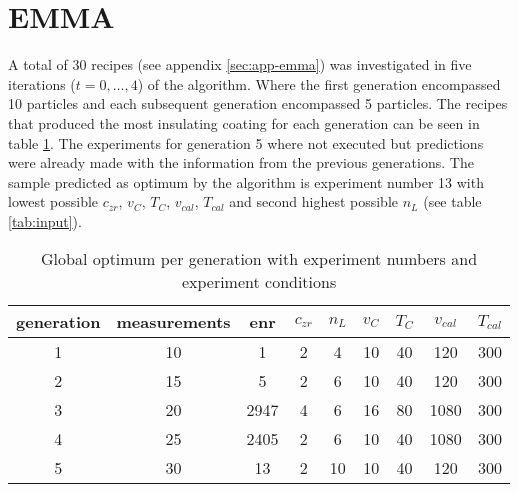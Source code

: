 \section{EMMA}
\label{sec:res-emma}
A total of 30 recipes (see appendix \ref{sec:app-emma}) was investigated in 
five iterations ($t = 0, \dots, 4$) of the algorithm. 
Where the first generation encompassed 10 particles and each subsequent generation encompassed 5 particles. 
The recipes that produced the most insulating coating for each generation can be seen in table \ref{tab:emma-Gb}. 
The experiments for generation 5 where not executed but 
predictions were already made
with the information from the previous generations. 
The sample predicted as optimum by the algorithm is experiment number 13 with 
lowest possible $c_{zr}$, $v_{C}$, $T_{C}$, $v_{cal}$, $T_{cal}$ and second highest possible $n_L$ (see table \ref{tab:input}). 

\begin{table}[htb]
	\centering
	\caption{Global optimum per generation with experiment numbers and experiment conditions}%
	\label{tab:emma-Gb}
	\begin{tabular}{ccccccccc}
        \hline\hline
		generation& measurements &enr &$c_{zr}$ &$n_L$ &$v_{C}$ &$T_{C}$ &$v_{cal}$ &$T_{cal}$\\
        \hline
	1  &10	&1       &2    &4   &10   &40  &120  &300\\
	2  &15	&5       &2    &6   &10   &40  &120  &300\\
	3  &20	&2947    &4    &6   &16   &80 &1080  &300\\
	4  &25	&2405    &2    &6   &10   &40 &1080  &300\\
	5  &30	&13      &2   &10   &10   &40  &120  &300\\
    \hline\hline
	\end{tabular}
\end{table}

